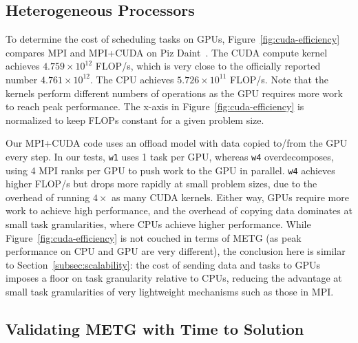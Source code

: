 \subsection{Heterogeneous Processors}



To determine the cost of scheduling tasks on GPUs, Figure~\ref{fig:cuda-efficiency} compares MPI
and MPI+CUDA on Piz Daint~\cite{PizDaint}. The CUDA
compute kernel achieves $4.759 \times 10^{12}$
FLOP/s, which is very close to the officially reported number
$4.761 \times 10^{12}$. The CPU achieves $5.726 \times 10^{11}$
FLOP/s. Note that the kernels perform different numbers of
operations as the GPU requires more work to reach peak
performance. The x-axis in Figure~\ref{fig:cuda-efficiency} is
normalized to keep FLOPs constant for a given problem
size.

Our MPI+CUDA code uses an offload model with data copied to/from the GPU every step. In our tests, \lstinline{w1} uses 1 task per GPU, whereas
\lstinline{w4} overdecomposes, using 4 MPI
ranks per GPU to push work to the GPU in parallel.
\lstinline{w4} achieves higher FLOP/s but
drops more rapidly at small problem sizes, due to the overhead of
running $4\times$ as many CUDA kernels. Either way,
GPUs require more work to achieve high performance, and the overhead
of copying data dominates at small task
granularities, where CPUs achieve higher
performance. While Figure~\ref{fig:cuda-efficiency} is not couched in
terms of METG (as peak performance on CPU and GPU are very
different), the conclusion here is similar to
Section~\ref{subsec:scalability}: the cost of sending data and
tasks to GPUs imposes a floor on task granularity relative to CPUs, reducing the advantage at small task granularities of
very lightweight mechanisms such as those in MPI.




\subsection{Validating METG with Time to Solution}




